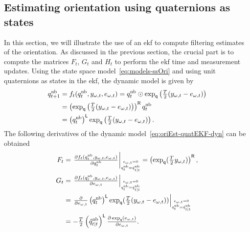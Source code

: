 \subsection{Estimating orientation using quaternions as states}
\label{sec:oriEst-quat-ekf}
In this section, we will illustrate the use of an \gls{ekf} to compute filtering estimates of the orientation. As discussed in the previous section, the crucial part is to compute the matrices $F_t$, $G_t$ and $H_t$ to perform the \gls{ekf} time and measurement updates. Using the state space model~\eqref{eq:models-ssOri} and using unit quaternions as states in the \gls{ekf}, the dynamic model is given by 
\begin{align}
q^\text{nb}_{t+1} &= f_t(q^\text{nb}_t,y_{\omega,t},e_{\omega,t}) = q^\text{nb}_t \odot \exp_\mathsf{q} \left(\tfrac{T}{2} ( y_{\omega,t} - e_{\omega,t} ) \right) \nonumber \\
&= \left( \exp_\mathsf{q} \left(\tfrac{T}{2} ( y_{\omega,t} - e_{\omega,t} ) \right) \right)^{\mathsf{R}} q^{\text{nb}}_t \nonumber \\
&= \left( q^\text{nb}_t \right)^{\mathsf{L}} \exp_\mathsf{q} \left(\tfrac{T}{2} ( y_{\omega,t} - e_{\omega,t} ) \right).
\label{eq:oriEst-quatEKF-dyn}
\end{align}
The following derivatives of the dynamic model~\eqref{eq:oriEst-quatEKF-dyn} can be obtained
\begin{subequations}
\begin{align}
F_t &= \givenThat{\tfrac{\partial f_t(q^\text{nb}_t,y_{\omega,t},e_{\omega,t})}{\partial q^\text{nb}_t}}{q^\text{nb}_{t}=\hat{q}^\text{nb}_{t \mid t}}{e_{\omega,t}=0} = \left( \expq (\tfrac{T}{2} y_{\omega,t} ) \right)^\rightMult, \\
G_t &= \givenThat{\tfrac{\partial f_t(q^\text{nb}_t,y_{\omega,t},e_{\omega,t})}{\partial e_{\omega,t}}}{q^\text{nb}_{t}=\hat{q}^\text{nb}_{t \mid t}}{e_{\omega,t}=0} \nonumber \\
&= \givenThat{\tfrac{\partial}{\partial e_{\omega,t}} \left( q^{\text{nb}}_t \right)^\leftMult \expq ( \tfrac{T}{2} ( y_{\omega,t} - e_{\omega,t} )) }{q^\text{nb}_{t}=\hat{q}^\text{nb}_{t \mid t}}{e_{\omega,t}=0} \nonumber \\
&= -\tfrac{T}{2} \left( \hat{q}^{\text{nb}}_{t \mid t} \right)^\leftMult \tfrac{\diff \expq (e_{\omega,t})}{\diff e_{\omega,t}}.
\end{align}
\end{subequations}

